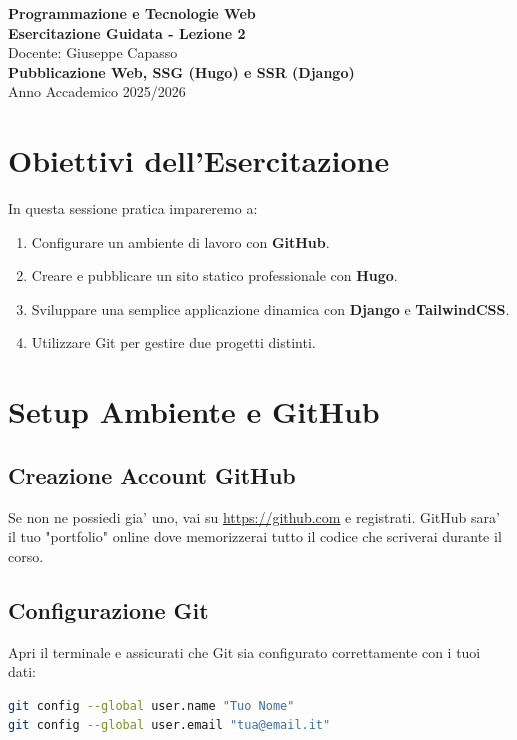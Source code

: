 \documentclass[11pt,a4paper]{report}
\begin{document}
\begin{titlepage}
    \centering
    \vspace*{4cm}
    {\Huge \textbf{\color{primary} Programmazione e Tecnologie Web}} \\[1.5cm]
    {\Large \textbf{Esercitazione Guidata - Lezione 2}} \\[0.5cm]
    {\large Docente: Giuseppe Capasso} \\[1.5cm]
    {\normalsize \textbf{Pubblicazione Web, SSG (Hugo) e SSR (Django)}} \\
    \vfill
    {\normalsize Anno Accademico 2025/2026}
\end{titlepage}

\newpage

\chapter*{Obiettivi dell'Esercitazione}
In questa sessione pratica impareremo a:
\begin{enumerate}
    \item Configurare un ambiente di lavoro con \textbf{GitHub}.
    \item Creare e pubblicare un sito statico professionale con \textbf{Hugo}.
    \item Sviluppare una semplice applicazione dinamica con \textbf{Django} e \textbf{TailwindCSS}.
    \item Utilizzare Git per gestire due progetti distinti.
\end{enumerate}

\chapter{Setup Ambiente e GitHub}

\section{Creazione Account GitHub}
Se non ne possiedi gia' uno, vai su \url{https://github.com} e registrati. GitHub sara' il tuo "portfolio" online dove memorizzerai tutto il codice che scriverai durante il corso.

\section{Configurazione Git}
Apri il terminale e assicurati che Git sia configurato correttamente con i tuoi dati:
\begin{lstlisting}[language=bash]
git config --global user.name "Tuo Nome"
git config --global user.email "tua@email.it"
\end{lstlisting}
\end{document}
